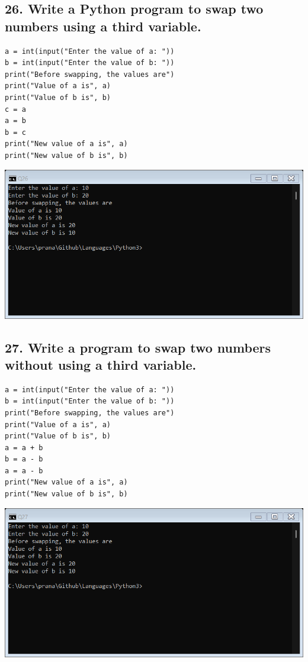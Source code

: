 \documentclass[12pt]{article}
\begin{document}
\subsection*{26. Write a Python program to swap two numbers using a third variable.}
\begin{verbatim}
a = int(input("Enter the value of a: "))
b = int(input("Enter the value of b: "))
print("Before swapping, the values are")
print("Value of a is", a)
print("Value of b is", b)
c = a
a = b
b = c
print("New value of a is", a)
print("New value of b is", b)
\end{verbatim}
\includegraphics[width=\linewidth]{images/26.png}

\subsection*{27. Write a program to swap two numbers without using a third variable.}
\begin{verbatim}
a = int(input("Enter the value of a: "))
b = int(input("Enter the value of b: "))
print("Before swapping, the values are")
print("Value of a is", a)
print("Value of b is", b)
a = a + b
b = a - b
a = a - b
print("New value of a is", a)
print("New value of b is", b)
\end{verbatim}
\includegraphics[width=\linewidth]{images/27.png}
\end{document}
